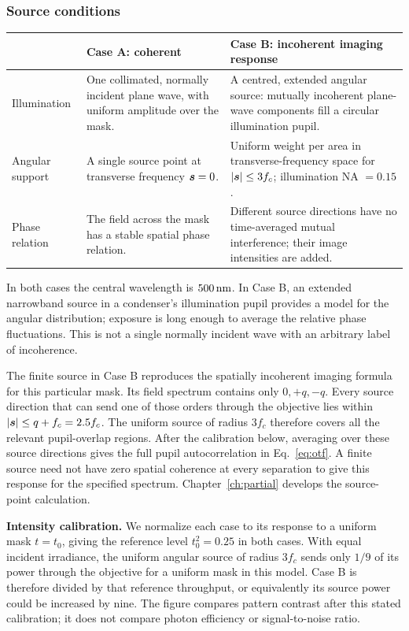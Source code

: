 \subsubsection*{Source conditions}
\begin{center}
\small
\begin{tabularx}{\textwidth}{@{}L{.19\textwidth}Y Y@{}}
\toprule
& Case A: coherent & Case B: incoherent imaging response\\
\midrule
Illumination &
One collimated, normally incident plane wave, with uniform amplitude
over the mask. &
A centred, extended angular source: mutually incoherent plane-wave
components fill a circular illumination pupil.\\
Angular support &
A single source point at transverse frequency $\bm{s}=0$. &
Uniform weight per area in transverse-frequency space for
$|\bm{s}|\leq3f_c$; illumination NA $=0.15$.\\
Phase relation &
The field across the mask has a stable spatial phase relation. &
Different source directions have no time-averaged mutual interference;
their image intensities are added.\\
\bottomrule
\end{tabularx}
\end{center}
In both cases the central wavelength is $500\,\mathrm{nm}$. In Case B, an extended
narrowband source in a condenser's illumination pupil provides a model
for the angular distribution; exposure is long enough to average the
relative phase fluctuations. This is not a single normally incident
wave with an arbitrary label of incoherence.

The finite source in Case B reproduces the spatially incoherent imaging
formula for this particular mask. Its field spectrum contains only
$0,+q,-q$. Every source direction that can send one of those orders
through the objective lies within $|\bm{s}|\leq q+f_c=2.5f_c$.
The uniform source of radius $3f_c$ therefore covers all the relevant
pupil-overlap regions. After the calibration below, averaging over
these source directions gives the full pupil autocorrelation in
Eq.~\eqref{eq:otf}. A finite source need not have zero spatial coherence
at every separation to give this response for the specified spectrum.
Chapter~\ref{ch:partial} develops the source-point calculation.

\textbf{Intensity calibration.}
We normalize each case to its response to a uniform mask $t=t_0$, giving
the reference level $t_0^2=0.25$ in both cases.
With equal incident irradiance, the uniform angular source of radius
$3f_c$ sends only $1/9$ of its power through the objective for a uniform
mask in this model. Case B is therefore divided by that reference
throughput, or equivalently its source power could be increased by nine.
The figure compares pattern contrast after this stated calibration;
it does not compare photon efficiency or signal-to-noise ratio.

